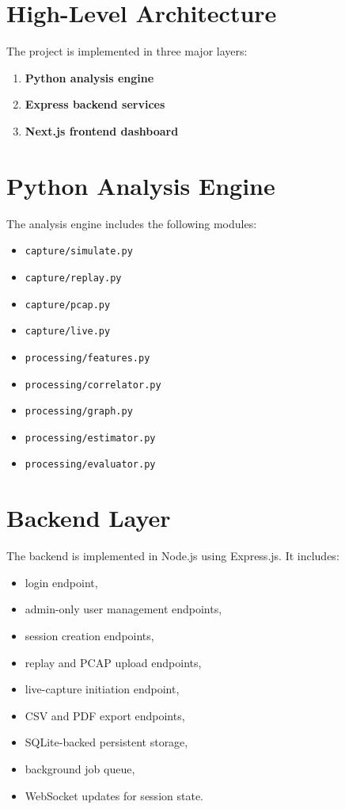 \documentclass[12pt,a4paper]{report}
\begin{document}
\section{High-Level Architecture}
The project is implemented in three major layers:
\begin{enumerate}[leftmargin=1.5em]
    \item \textbf{Python analysis engine}
    \item \textbf{Express backend services}
    \item \textbf{Next.js frontend dashboard}
\end{enumerate}

\section{Python Analysis Engine}
The analysis engine includes the following modules:
\begin{itemize}[leftmargin=1.5em]
    \item \texttt{capture/simulate.py}
    \item \texttt{capture/replay.py}
    \item \texttt{capture/pcap.py}
    \item \texttt{capture/live.py}
    \item \texttt{processing/features.py}
    \item \texttt{processing/correlator.py}
    \item \texttt{processing/graph.py}
    \item \texttt{processing/estimator.py}
    \item \texttt{processing/evaluator.py}
\end{itemize}

\section{Backend Layer}
The backend is implemented in Node.js using Express.js. It includes:
\begin{itemize}[leftmargin=1.5em]
    \item login endpoint,
    \item admin-only user management endpoints,
    \item session creation endpoints,
    \item replay and PCAP upload endpoints,
    \item live-capture initiation endpoint,
    \item CSV and PDF export endpoints,
    \item SQLite-backed persistent storage,
    \item background job queue,
    \item WebSocket updates for session state.
\end{itemize}
\end{document}
